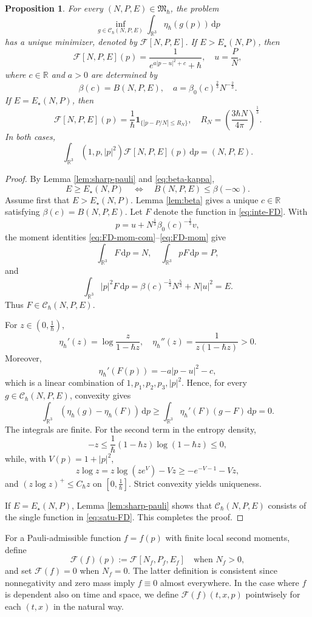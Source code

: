 \documentclass[10pt,reqno]{amsart}
\numberwithin{equation}{section}
\newtheorem{proposition}{Proposition}[section]
\theoremstyle{definition}
\newcommand{\R}{\mathbb R}
\newcommand{\dpp}{\mathrm{d}p}
\newcommand{\one}{\mathbf 1}
\newcommand{\calC}{\mathcal C}
\newcommand{\calF}{\mathcal F}
\newcommand{\bq}{\begin{equation}}
\newcommand{\eq}{\end{equation}}
\newcommand{\lt}{\left}
\newcommand{\rt}{\right}
\begin{document}
\begin{proposition}\label{prop:vari}
For every $(N,P,E)\in\mathfrak M_\hbar$, the problem
\[
 \inf_{g\in\calC_\hbar(N,P,E)}  \int_{\R^3}\eta_\hbar(g(p))\,\dpp
\]
has a unique minimizer, denoted by $\calF[N,P,E]$.  If $E>E_\star(N,P)$, then
\bq \label{eq:inte-FD}
 \calF[N,P,E](p)  =\frac1{e^{a|p-u|^2+c}+\hbar},  \quad  u=\frac PN,
\eq
where $c\in\R$ and $a>0$ are determined by
\[
 \beta(c)=B(N,P,E),  \quad  a=\beta_0(c)^{\frac23}N^{-\frac23}.
\]
If $E=E_\star(N,P)$, then
\bq \label{eq:satu-FD}
 \calF[N,P,E](p)  =\frac1\hbar\one_{\{|p-P/N|\leq R_N\}},  \quad  R_N=\lt(\frac{3\hbar N}{4\pi}\rt)^{\frac13}.
\eq
In both cases,
\[
 \int_{\R^3}(1,p,|p|^2)\calF[N,P,E](p)\,\dpp=(N,P,E).
\]
\end{proposition}

\begin{proof}
By Lemma \ref{lem:sharp-pauli} and \eqref{eq:beta-kappa},
\[
 E\geq E_\star(N,P)  \quad\Longleftrightarrow\quad  B(N,P,E)\leq\beta(-\infty).
\]
Assume first that $E>E_\star(N,P)$.  Lemma \ref{lem:beta} gives a unique $c\in\R$ satisfying $\beta(c)=B(N,P,E)$.  Let $F$ denote the function in \eqref{eq:inte-FD}.  With
\[
 p=u+N^{\frac13}\beta_0(c)^{-\frac13}v,
\]
the moment identities \eqref{eq:FD-mom-com}--\eqref{eq:FD-mom} give
\[
 \int_{\R^3}F\,\dpp=N,  \quad  \int_{\R^3}pF\,\dpp=P,
\]
and
\[
 \int_{\R^3}|p|^2F\,\dpp  =\beta(c)^{-\frac53}N^{\frac53}+N|u|^2=E.
\]
Thus $F\in\calC_\hbar(N,P,E)$.

For $z\in(0,\frac1\hbar )$,
\[
 \eta_\hbar'(z)=\log\frac{z}{1-\hbar z},  \quad  \eta_\hbar''(z)=\frac1{z(1-\hbar z)}>0.
\]
Moreover,
\[
 \eta_\hbar'(F(p))=-a|p-u|^2-c,
\]
which is a linear combination of $1,p_1,p_2,p_3,|p|^2$.  Hence, for every $g\in\calC_\hbar(N,P,E)$, convexity gives
\[
 \int_{\R^3}\lt(\eta_\hbar(g)-\eta_\hbar(F)\rt)\,\dpp \geq\int_{\R^3}\eta_\hbar'(F)(g-F)\,\dpp =0.
\]
The integrals are finite. For the second term in the entropy density,
\[
 -z\leq\frac1\hbar(1-\hbar z)\log(1-\hbar z)\leq0,
\]
while, with $V(p)=1+|p|^2$,
\[
 z\log z=z\log(ze^V)-Vz\geq-e^{-V-1}-Vz,
\]
and $(z\log z)^+\leq C_\hbar z$ on $[0,\frac1\hbar ]$.  Strict convexity yields uniqueness.

If $E=E_\star(N,P)$, Lemma \ref{lem:sharp-pauli} shows that $\calC_\hbar(N,P,E)$ consists of the single function in \eqref{eq:satu-FD}.  This completes the proof.
\end{proof}

For a Pauli-admissible function $f=f(p)$ with finite local second moments, define
\[
 \calF(f)(p)  :=\calF[N_f,P_f,E_f]  \quad\text{when }N_f>0,
\]
and set $\calF(f)=0$ when $N_f=0$. The latter definition is consistent since nonnegativity and zero mass imply $f\equiv 0$ almost everywhere. In the case where $f$ is dependent also on time and space, we define $\calF(f)(t,x,p)$ pointwisely for each $(t,x)$ in the natural way. 
\end{document}
